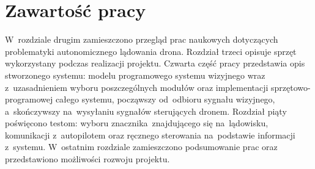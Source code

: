 

\section{Zawartość pracy}
\label{sec:zawartoscPracy}

W~rozdziale drugim zamieszczono przegląd prac naukowych dotyczących problematyki autonomicznego lądowania drona. 
Rozdział trzeci opisuje sprzęt wykorzystany podczas realizacji projektu. 
Czwarta część pracy przedstawia opis stworzonego systemu: modelu programowego systemu wizyjnego wraz z~uzasadnieniem wyboru poszczególnych modułów oraz implementacji sprzętowo-programowej całego systemu, począwszy od~odbioru sygnału wizyjnego, a~skończywszy na~wysyłaniu sygnałów sterujących dronem. 
Rozdział piąty poświęcono testom: wyboru znacznika~znajdującego się na~lądowisku, komunikacji z~autopilotem oraz ręcznego sterowania na~podstawie informacji z~systemu. 
W~ostatnim rozdziale zamieszczono podsumowanie prac oraz przedstawiono możliwości rozwoju projektu.

